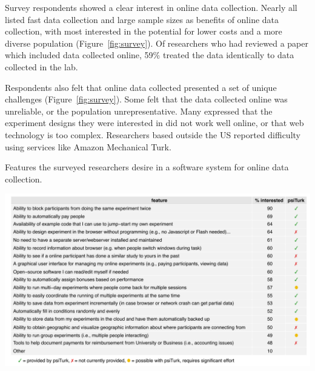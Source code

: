 \documentclass[twocolumn]{svjour3}          %
\begin{document}
Survey respondents showed a clear interest in online data collection. Nearly all listed fast data
collection and large sample sizes as benefits of online data collection, with most
interested in the potential for lower costs and a more diverse population
(Figure~\ref{fig:survey}). Of researchers who had reviewed a paper which included data 
collected online, 59\% treated the data identically to data collected in the lab.



Respondents also felt that online data collected presented a set of unique challenges 
(Figure~\ref{fig:survey}).  Some felt that the data collected online was unreliable, or the
population unrepresentative. Many expressed that the experiment designs they were interested in did
not work well online, or that web technology is too complex. Researchers based
outside the US reported difficulty using services like Amazon Mechanical Turk.

\begin{table}[tp]
\centering
\caption{Features the surveyed researchers desire in a software system for online data collection.}
\includegraphics[width=\textwidth]{figures/featuresTable.pdf}
\label{tab:features}
\end{table}
\end{document}
